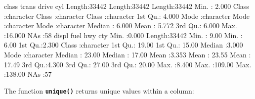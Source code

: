 \documentclass[
]{book}
\newenvironment{Shaded}{\begin{snugshade}}{\end{snugshade}}
\newcommand{\DecValTok}[1]{\textcolor[rgb]{0.00,0.00,0.81}{#1}}
\newcommand{\FloatTok}[1]{\textcolor[rgb]{0.00,0.00,0.81}{#1}}
\newcommand{\FunctionTok}[1]{\textcolor[rgb]{0.00,0.00,0.00}{#1}}
\newcommand{\NormalTok}[1]{#1}
\newcommand{\SpecialCharTok}[1]{\textcolor[rgb]{0.00,0.00,0.00}{#1}}
\newcommand{\StringTok}[1]{\textcolor[rgb]{0.31,0.60,0.02}{#1}}
\begin{document}
\begin{Shaded}
\begin{Highlighting}[]
\NormalTok{    class              trans              drive                cyl        }
\NormalTok{ Length}\SpecialCharTok{:}\DecValTok{33442}\NormalTok{       Length}\SpecialCharTok{:}\DecValTok{33442}\NormalTok{       Length}\SpecialCharTok{:}\DecValTok{33442}\NormalTok{       Min.   }\SpecialCharTok{:} \FloatTok{2.000}  
\NormalTok{ Class }\SpecialCharTok{:}\NormalTok{character   Class }\SpecialCharTok{:}\NormalTok{character   Class }\SpecialCharTok{:}\NormalTok{character   1st Qu.}\SpecialCharTok{:} \FloatTok{4.000}  
\NormalTok{ Mode  }\SpecialCharTok{:}\NormalTok{character   Mode  }\SpecialCharTok{:}\NormalTok{character   Mode  }\SpecialCharTok{:}\NormalTok{character   Median }\SpecialCharTok{:} \FloatTok{6.000}  
\NormalTok{                                                          Mean   }\SpecialCharTok{:} \FloatTok{5.772}  
\NormalTok{                                                          3rd Qu.}\SpecialCharTok{:} \FloatTok{6.000}  
\NormalTok{                                                          Max.   }\SpecialCharTok{:}\FloatTok{16.000}  
\NormalTok{                                                          NA}\StringTok{\textquotesingle{}s   :58      }
\StringTok{     displ           fuel                hwy              cty        }
\StringTok{ Min.   :0.000   Length:33442       Min.   :  9.00   Min.   :  6.00  }
\StringTok{ 1st Qu.:2.300   Class :character   1st Qu.: 19.00   1st Qu.: 15.00  }
\StringTok{ Median :3.000   Mode  :character   Median : 23.00   Median : 17.00  }
\StringTok{ Mean   :3.353                      Mean   : 23.55   Mean   : 17.49  }
\StringTok{ 3rd Qu.:4.300                      3rd Qu.: 27.00   3rd Qu.: 20.00  }
\StringTok{ Max.   :8.400                      Max.   :109.00   Max.   :138.00  }
\StringTok{ NA\textquotesingle{}}\NormalTok{s   }\SpecialCharTok{:}\DecValTok{57}                                                          
\end{Highlighting}
\end{Shaded}

The function \textbf{\texttt{unique()}} returns unique values within a column:

\begin{Shaded}
\end{Shaded}
\end{document}
